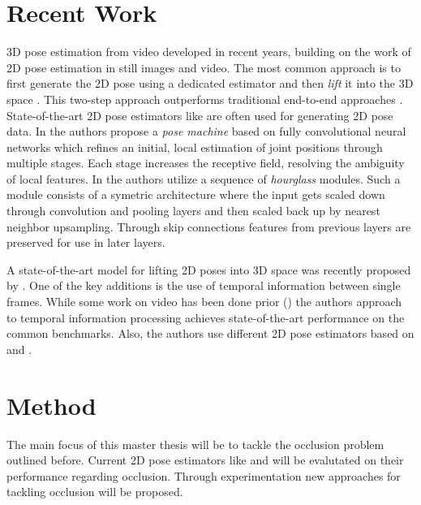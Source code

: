 \documentclass[twoside]{article}
\begin{document}
\begin{multicols}{2}
\section{Recent Work}
\label{sec:recent}
3D pose estimation from video developed in recent years, building on the work of 2D pose estimation in still images and video.
The most common approach is to first generate the 2D pose using a dedicated estimator and then \textit{lift} it into the 3D space \cite{pavllo_3d_2019}\cite{martinez_simple_2017}.
This two-step approach outperforms traditional end-to-end approaches \cite{pavllo_3d_2019}.
State-of-the-art 2D pose estimators like \cite{newell_stacked_2016}\cite{wei_convolutional_2016} are often used for generating 2D pose data.
In \cite{wei_convolutional_2016} the authors propose a \textit{pose machine} based on fully convolutional neural networks which refines an initial, local estimation of joint positions through multiple stages.
Each stage increases the receptive field, resolving the ambiguity of local features.
In \cite{newell_stacked_2016} the authors utilize a sequence of \textit{hourglass} modules.
Such a module consists of a symetric architecture where the input gets scaled down through convolution and pooling layers and then scaled back up by nearest neighbor upsampling.
Through skip connections features from previous layers are preserved for use in later layers.

A state-of-the-art model for lifting 2D poses into 3D space was recently proposed by \cite{pavllo_3d_2019}.
One of the key additions is the use of temporal information between single frames.
While some work on video has been done prior (\cite{lin_recurrent_2017}\cite{hossain_exploiting_2018}) the authors approach to temporal information processing achieves state-of-the-art performance on the common benchmarks. 
Also, the authors use different 2D pose estimators based on \cite{he_mask_2017} and \cite{chen_cascaded_2018}.


\section{Method}
The main focus of this master thesis will be to tackle the occlusion problem outlined before.
Current 2D pose estimators like \cite{newell_stacked_2016} and \cite{wei_convolutional_2016} will be evalutated on their performance regarding occlusion.
Through experimentation new approaches for tackling occlusion will be proposed.


\end{multicols}
\end{document}

